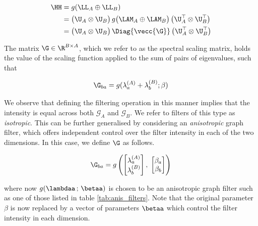 \begin{align} 
    \HH &= g(\LL_A \oplus \LL_B) \notag \\ 
       &= \big( \U_A \otimes \U_B \big) \, g \big( \LAM_A \oplus \LAM_B \big) \, \big( \U_A^\top \otimes \U_B^\top \big) \\
       &= \big( \U_A \otimes \U_B \big) \, \Diag{\vecc{\G}} \, \big( \U_A^\top \otimes \U_B^\top \big)
\end{align}

The matrix $\G \in \R^{B \times A}$, which we refer to as the spectral scaling matrix, holds the value of the scaling function applied to the sum of
pairs of eigenvalues, such that

\begin{equation}
    \G_{ba} = g(\lambda^{(A)}_a + \lambda^{(B)}_b; \beta)
\end{equation}

We observe that defining the filtering operation in this manner implies that the intensity is equal across both $\mathcal{G}_A$ and $\mathcal{G}_B$. We refer to filters of this type as \textit{isotropic}. This can be further generalised by considering an \textit{anisotropic} graph filter, which offers independent control over the filter intensity in each of the two dimensions. In this case, we define $\G$ as follows. 

\begin{equation}
    \G_{ba} =  g \left( \begin{bmatrix}
        \lambda^{(A)}_a \\ \lambda^{(B)}_b 
    \end{bmatrix}, \; \begin{bmatrix}
        \beta_a \\ \beta_b 
    \end{bmatrix} \right)
\end{equation}

where now $g(\lambdaa \,; \, \betaa)$ is chosen to be an anisotropic graph filter such as one of those listed in table \ref{tab:anis_filters}. Note that the original parameter $\beta$ is now replaced by a vector of parameters $\betaa$ which control the filter intensity in each dimension. 


